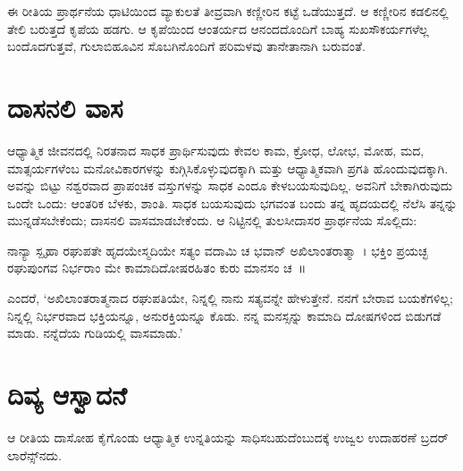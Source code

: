 ಈ ರೀತಿಯ ಪ್ರಾರ್ಥನೆಯ ಧಾಟಿಯಿಂದ ವ್ಯಾಕುಲತೆ ತೀವ್ರವಾಗಿ ಕಣ್ಣೀರಿನ ಕಟ್ಟೆ ಒಡೆಯುತ್ತದೆ. ಆ ಕಣ್ಣೀರಿನ ಕಡಲಿನಲ್ಲಿ ತೇಲಿ ಬರುತ್ತದೆ ಕೃಪೆಯ ಹಡಗು. ಆ ಕೃಪೆಯಿಂದ ಆಂತರ್ಯದ ಆನಂದದೊಂದಿಗೆ ಬಾಹ್ಯ ಸುಖಸೌಕರ್ಯಗಳೆಲ್ಲ ಬಂದೊದಗುತ್ತವೆ, ಗುಲಾಬಿಹೂವಿನ ಸೊಬಗಿನೊಂದಿಗೆ ಪರಿಮಳವು ತಾನೇತಾನಾಗಿ ಬರುವಂತೆ.


\section{ದಾಸನಲಿ ವಾಸ}

ಆಧ್ಯಾತ್ಮಿಕ ಜೀವನದಲ್ಲಿ ನಿರತನಾದ ಸಾಧಕ ಪ್ರಾರ್ಥಿಸುವುದು ಕೇವಲ ಕಾಮ, ಕ್ರೋಧ, ಲೋಭ, ಮೋಹ, ಮದ, ಮಾತ್ಸರ್ಯಗಳೆಂಬ ಮನೋವಿಕಾರಗಳನ್ನು ಕುಗ್ಗಿಸಿಕೊಳ್ಳುವುದಕ್ಕಾಗಿ ಮತ್ತು ಆಧ್ಯಾತ್ಮಿಕವಾಗಿ ಪ್ರಗತಿ ಹೊಂದುವುದಕ್ಕಾಗಿ. ಅವನ್ನು ಬಿಟ್ಟು ನಶ್ವರವಾದ ಪ್ರಾಪಂಚಿಕ ವಸ್ತುಗಳನ್ನು ಸಾಧಕ ಎಂದೂ ಕೇಳಬಯಸುವುದಿಲ್ಲ. ಅವನಿಗೆ ಬೇಕಾಗಿರುವುದು ಒಂದೇ ಒಂದು: ಆಂತರಿಕ ಬೆಳಕು, ಶಾಂತಿ. ಸಾಧಕ ಬಯಸುವುದು ಭಗವಂತ ಬಂದು ತನ್ನ ಹೃದಯದಲ್ಲಿ ನೆಲೆಸಿ ತನ್ನನ್ನು ಮುನ್ನಡೆಸಬೇಕೆಂದು; ದಾಸನಲಿ ವಾಸಮಾಡಬೇಕೆಂದು. ಆ ನಿಟ್ಟಿನಲ್ಲಿ ತುಲಸೀದಾಸರ ಪ್ರಾರ್ಥನೆಯ ಸೊಲ್ಲಿದು:

ನಾನ್ಯಾ ಸ್ಪೃಹಾ ರಘುಪತೇ ಹೃದಯೇಸ್ಮದಿಯೇ ಸತ್ಯಂ ವದಾಮಿ ಚ ಭವಾನ್ ಅಖಿಲಾಂತರಾತ್ಮಾ~। ಭಕ್ತಿಂ ಪ್ರಯಚ್ಛ ರಘುಪುಂಗವ ನಿರ್ಭರಾಂ ಮೇ ಕಾಮಾದಿದೋಷರಹಿತಂ ಕುರು ಮಾನಸಂ ಚ~॥

ಎಂದರೆ, ‘ಅಖಿಲಾಂತರಾತ್ಮನಾದ ರಘುಪತಿಯೇ, ನಿನ್ನಲ್ಲಿ ನಾನು ಸತ್ಯವನ್ನೇ ಹೇಳುತ್ತೇನೆ. ನನಗೆ ಬೇರಾವ ಬಯಕೆಗಳಿಲ್ಲ; ನಿನ್ನಲ್ಲಿ ನಿರ್ಭರವಾದ ಭಕ್ತಿಯನ್ನೂ, ಅನುರಕ್ತಿಯನ್ನೂ ಕೊಡು. ನನ್ನ ಮನಸ್ಸನ್ನು ಕಾಮಾದಿ ದೋಷಗಳಿಂದ ಬಿಡುಗಡೆ ಮಾಡು. ನನ್ನೆದೆಯ ಗುಡಿಯಲ್ಲಿ ವಾಸಮಾಡು.’


\section{ದಿವ್ಯ ಆಸ್ವಾದನೆ}

ಆ ರೀತಿಯ ದಾಸೋಹ ಕೈಗೊಂಡು ಆಧ್ಯಾತ್ಮಿಕ ಉನ್ನತಿಯನ್ನು ಸಾಧಿಸಬಹುದೆಂಬುದಕ್ಕೆ ಉಜ್ವಲ ಉದಾಹರಣೆ ಬ್ರದರ್ ಲಾರೆನ್ಸ್​ನದು.

